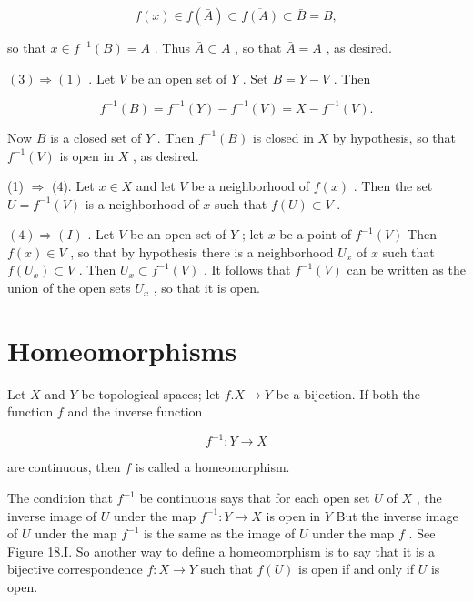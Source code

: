 \[
f\left( x\right)  \in  f\left( \bar{A}\right)  \subset  \overline{f\left( A\right) } \subset  \bar{B} = B,
\]

so that \(x \in  {f}^{-1}\left( B\right)  = A\) . Thus \(\bar{A} \subset  A\) , so that \(\bar{A} = A\) , as desired.

\(\left( 3\right)  \Rightarrow  \left( 1\right)\) . Let \(V\) be an open set of \(Y\) . Set \(B = Y - V\) . Then

\[
{f}^{-1}\left( B\right)  = {f}^{-1}\left( Y\right)  - {f}^{-1}\left( V\right)  = X - {f}^{-1}\left( V\right) .
\]

Now \(B\) is a closed set of \(Y\) . Then \({f}^{-1}\left( B\right)\) is closed in \(X\) by hypothesis, so that \({f}^{-1}\left( V\right)\) is open in \(X\) , as desired.

(1) \(\Rightarrow\) (4). Let \(x \in  X\) and let \(V\) be a neighborhood of \(f\left( x\right)\) . Then the set \(U = {f}^{-1}\left( V\right)\) is a neighborhood of \(x\) such that \(f\left( U\right)  \subset  V\) .

\(\left( 4\right)  \Rightarrow  \left( I\right)\) . Let \(V\) be an open set of \(Y\) ; let \(x\) be a point of \({f}^{-1}\left( V\right)\) Then \(f\left( x\right)  \in  V\) , so that by hypothesis there is a neighborhood \({U}_{x}\) of \(x\) such that \(f\left( {U}_{x}\right)  \subset  V\) . Then \({U}_{x} \subset  {f}^{-1}\left( V\right)\) . It follows that \({f}^{-1}\left( V\right)\) can be written as the union of the open sets \({U}_{x}\) , so that it is open.

\section*{Homeomorphisms}

Let \(X\) and \(Y\) be topological spaces; let \(f.X \rightarrow  Y\) be a bijection. If both the function \(f\) and the inverse function

\[
{f}^{-1} : Y \rightarrow  X
\]

are continuous, then \(f\) is called a homeomorphism.

The condition that \({f}^{-1}\) be continuous says that for each open set \(U\) of \(X\) , the inverse image of \(U\) under the map \({f}^{-1} : Y \rightarrow  X\) is open in \(Y\) But the inverse image of \(U\) under the map \({f}^{-1}\) is the same as the image of \(U\) under the map \(f\) . See Figure 18.I. So another way to define a homeomorphism is to say that it is a bijective correspondence \(f : X \rightarrow  Y\) such that \(f\left( U\right)\) is open if and only if \(U\) is open.


